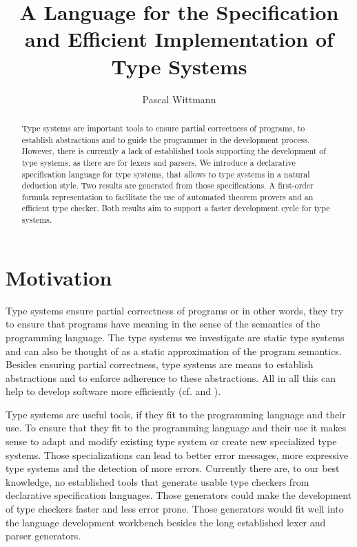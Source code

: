 \documentclass{acm_proc_article-sp}
\begin{document}
\title{A Language for the Specification and Efficient Implementation
  of Type Systems}


\author{
\alignauthor
Pascal Wittmann
}

\maketitle

\begin{abstract}
  Type systems are important tools to ensure partial correctness of
  programs, to establish abstractions and to guide the programmer in
  the development process. However, there is currently a lack of
  established tools supporting the development of type systems, as
  there are for lexers and parsers. We introduce a declarative
  specification language for type systems, that allows to type systems
  in a natural deduction style. Two results are generated from those
  specifications. A first-order formula representation to facilitate
  the use of automated theorem provers and an efficient type
  checker. Both results aim to support a faster development cycle for
  type systems.
 \end{abstract}

\section{Motivation}
Type systems ensure partial correctness of programs or in other words,
they try to ensure that programs have meaning in the sense of the
semantics of the programming language. The type systems we investigate
are static type systems and can also be thought of as a static
approximation of the program semantics. Besides ensuring partial
correctness, type systems are means to establish abstractions and to
enforce adherence to these abstractions. All in all this can help to
develop software more efficiently
(cf. \cite{Petersen:2014:ECS:2597008.2597152} and
\cite{Mayer:2012:ESI:2384616.2384666}).

Type systems are useful tools, if they fit to the programming language
and their use. To ensure that they fit to the programming language and
their use it makes sense to adapt and modify existing type system or
create new specialized type systems. Those specializations can lead to
better error messages, more expressive type systems and the detection
of more errors. Currently there are, to our best knowledge, no
established tools that generate usable type checkers from declarative
specification languages. Those generators could make the development
of type checkers faster and less error prone. Those generators would
fit well into the language development workbench besides the long
established lexer and parser generators.
\end{document}
